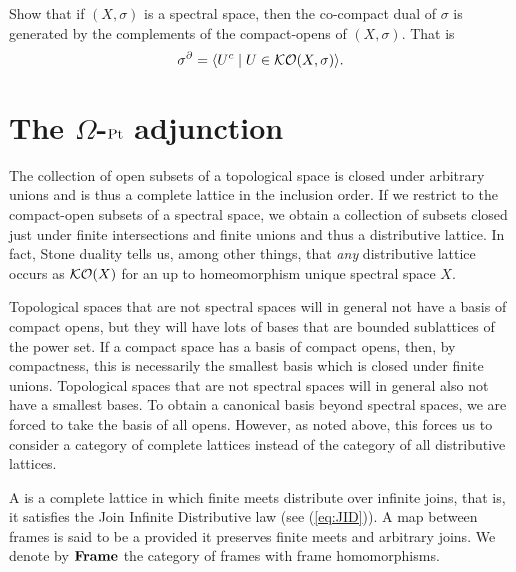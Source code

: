 \begin{exercise}\label{exer:co-compactdualofStone}
  Show that if $(X,\sigma)$ is a spectral space, then the co-compact dual of $\sigma$ is generated by the complements of the compact-opens of $(X,\sigma)$. That is
  \[
  \sigma^\partial=\langle U^c\mid U\in\mathcal{KO}(X,\sigma)\rangle.
  \]
  \end{exercise}


\section{The \texorpdfstring{$\Omega$}{Omega}-\texorpdfstring{$\mathrm{Pt}$}{Pt} adjunction}\label{sec:Omega-Pt-adjunction}

The collection of open subsets of a topological space is closed under arbitrary unions and is thus a complete lattice in the inclusion order. If we restrict to the compact-open subsets of a spectral space, we obtain a collection of subsets closed just under finite intersections and finite unions and thus a distributive lattice. In fact, Stone duality tells us, among other things, that \emph{any} distributive lattice occurs as  $\mathcal{KO}(X)$ for an up to homeomorphism unique spectral space $X$.

Topological spaces that are not spectral spaces  will in general not have a basis of compact opens, but they will have lots of bases that  are bounded sublattices of the power set.
 If a compact space has a basis of compact opens, then, by compactness, this is necessarily the smallest basis which is closed under finite unions. Topological spaces that are not spectral spaces  will in general also not have a smallest bases. To obtain a canonical basis beyond spectral spaces, we are forced to take the basis of all opens. However, as noted above, this forces us to consider a category of complete lattices instead of the category of all distributive lattices.

\begin{definition}\label{def:frame}
A  is a complete lattice in which finite meets distribute over infinite joins, that is, it satisfies the Join Infinite Distributive law (see (\ref{eq:JID})). A map between frames is said to be a  provided it preserves finite meets and arbitrary joins. We denote by $\mathbf{Frame}$ the category of frames with frame homomorphisms.
\end{definition}

